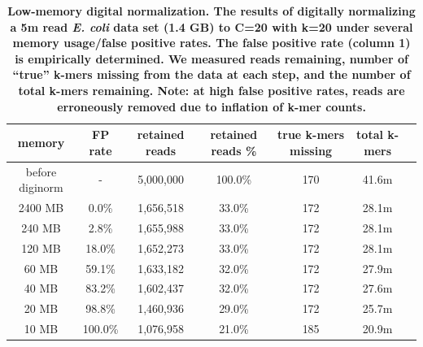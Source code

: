 \documentclass[10pt]{article}
\begin{document}
\begin{table}[!ht]
\caption{ \bf{Low-memory digital normalization. The results of
    digitally normalizing a 5m read {\em E. coli} data set (1.4 GB) to C=20
    with k=20 under several memory usage/false positive rates.  The
    false positive rate (column 1) is empirically determined.  We
    measured reads remaining, number of ``true'' k-mers missing from
    the data at each step, and the number of total k-mers remaining.
    Note: at high false positive rates, reads are erroneously removed due to
    inflation of k-mer counts.}}
\begin{tabular}{ | c | c | c | c | c | c | c |}
\hline
memory   & FP rate & retained reads & retained reads \% & true k-mers missing & total k-mers \\
\hline
before diginorm   &  -      & 5,000,000   & 100.0\%    & 170  &  41.6m \\
2400 MB           &   0.0\% & 1,656,518   &  33.0\%    & 172  &  28.1m \\
240 MB            &   2.8\% & 1,655,988   &  33.0\%    & 172  &  28.1m \\
120 MB            &  18.0\% & 1,652,273   &  33.0\%    & 172  &  28.1m \\
60 MB             &  59.1\% & 1,633,182   &  32.0\%    & 172  &  27.9m \\
40 MB             &  83.2\% & 1,602,437   &  32.0\%    & 172  &  27.6m \\
20 MB             &  98.8\% & 1,460,936   &  29.0\%    & 172  &  25.7m \\
10 MB             & 100.0\% & 1,076,958   &  21.0\%    & 185  &  20.9m \\
\end{tabular}
\begin{flushleft}
\end{flushleft}
\label{table:loop_norm}
\end{table}

\end{document}
